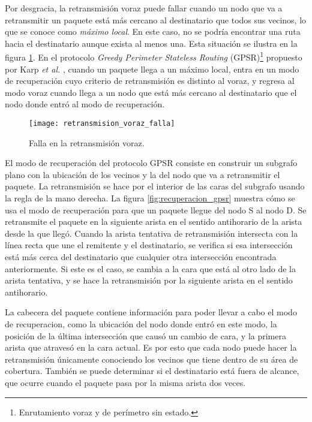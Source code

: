 Por desgracia, la retransmisión voraz puede fallar cuando un nodo que va a
retransmitir un paquete está más cercano al destinatario que todos sus vecinos,
lo que se conoce como \textit{máximo local}. En este caso, no se podría
encontrar una ruta hacia el destinatario aunque exista al menos una. Esta
situación se ilustra en la figura \ref{fig:retransmision_voraz_falla}. En el
protocolo \textit{Greedy Perimeter Stateless Routing}
(GPSR)\footnote{Enrutamiento voraz y de perímetro sin estado.} propuesto por
Karp \textit{et al.} \cite{Karp2000}, cuando un paquete llega a un máximo
local, entra en un modo de recuperación cuyo criterio de retransmisión es
distinto al voraz, y regresa al modo voraz cuando llega a un nodo que está más
cercano al destinatario que el nodo donde entró al modo de recuperación.

\begin{figure}[th]
\centering
\texttt{[image: retransmision\_voraz\_falla]}
\decoRule
\caption[Falla en la retransmisión voraz]{Falla en la retransmisión
voraz\protect\footnotemark.}
\label{fig:retransmision_voraz_falla}
\end{figure}


El modo de recuperación del protocolo GPSR consiste en construir un subgrafo
plano con la ubicación de los vecinos y la del nodo que va a retransmitir el
paquete. La retransmisión se hace por el interior de las caras del subgrafo
usando la regla de la mano derecha. La figura \ref{fig:recuperacion_gpsr}
muestra cómo se usa el modo de recuperación para que un paquete llegue del nodo
S al nodo D. Se retransmite el paquete en la siguiente arista en el sentido
antihorario de la arista desde la que llegó. Cuando la arista tentativa de
retransmisión intersecta con la línea recta que une el remitente y el
destinatario, se verifica si esa intersección está más cerca del destinatario
que cualquier otra intersección encontrada anteriormente. Si este es el caso,
se cambia a la cara que está al otro lado de la arista tentativa, y se hace la
retransmisión por la siguiente arista en el sentido antihorario.

La cabecera del paquete contiene información para poder llevar a cabo el modo de
recuperacion, como la ubicación del nodo donde entró en este modo, la posición
de la última intersección que causó un cambio de cara, y la primera arista que
atravesó en la cara actual. Es por esto que cada nodo puede hacer la
retransmisión únicamente conociendo los vecinos que tiene dentro de su área de
cobertura. También se puede determinar si el destinatario está fuera de alcance,
que ocurre cuando el paquete pasa por la misma arista dos veces.

